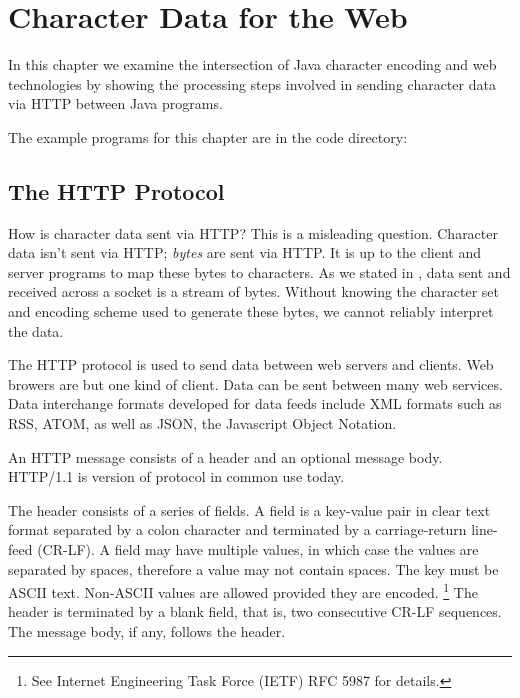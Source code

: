 \chapter{Character Data for the Web}\label{chap:web}

In this chapter we examine the intersection of Java character encoding 
and web technologies by showing the processing steps involved 
in sending character data via HTTP between Java programs.

The example programs for this chapter are in the code directory:
%
%

\section{The HTTP Protocol}\label{section:http}

How is character data sent via HTTP?
This is a misleading question.
Character data isn't sent via HTTP; \emph{bytes} are sent via HTTP.
It is up to the client and server programs to map these bytes to characters.
As we stated in ,
data sent and received across a socket is a stream of bytes.
Without knowing the character set and encoding scheme used to generate
these bytes, we cannot reliably interpret the data.

The HTTP protocol is used to send data between web servers and clients.
Web browers are but one kind of client.
Data can be sent between many web services.
Data interchange formats developed for data feeds include XML formats such as
RSS, ATOM, as well as JSON, the Javascript Object Notation.

An HTTP message consists of a header and an optional message body.
HTTP/1.1 is version of protocol in common use today.

The header consists of a series of fields.
A field is a key-value pair in clear text format separated by a colon character
and terminated by a carriage-return line-feed (CR-LF).
A field may have multiple values, in which case the values are separated by spaces,
therefore a value may not contain spaces.
The key must be ASCII text.
Non-ASCII values are allowed provided they are encoded.%
%
\footnote{See Internet Engineering Task Force (IETF) RFC 5987 for details.}
%
The header is terminated by a blank field, that is, two consecutive CR-LF sequences.
The message body, if any, follows the header.

